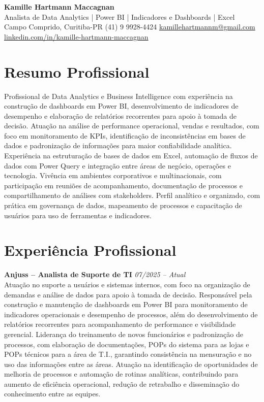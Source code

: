 \documentclass[11pt,a4paper]{article}
\newcommand{\cvheader}[4]{%
  \begin{center}
    {\LARGE\bfseries #1}\\[4pt]
    {\large #2}\\[6pt]
    #3\\[2pt]
    #4
  \end{center}
  \vspace{4pt}
}
\newcommand{\experience}[3]{%
  \textbf{#1} \hfill \textit{#2}\\[4pt]
  #3
  \vspace{8pt}
}
\begin{document}
\cvheader{Kamille Hartmann Maccagnan}%
{Analista de Data Analytics | Power BI | Indicadores e Dashboards | Excel}%
{Campo Comprido, Curitiba-PR \textbullet{} (41) 9 9928-4424 \textbullet{} \href{mailto:kamillehartmannm@gmail.com}{kamillehartmannm@gmail.com}}%
{\href{https://linkedin.com/in/kamille-hartmann-maccagnan/}{linkedin.com/in/kamille-hartmann-maccagnan}}

\section*{Resumo Profissional}

Profissional de Data Analytics e Business Intelligence com experiência na construção de dashboards em Power BI, desenvolvimento de indicadores de desempenho e elaboração de relatórios recorrentes para apoio à tomada de decisão. Atuação na análise de performance operacional, vendas e resultados, com foco em monitoramento de KPIs, identificação de inconsistências em bases de dados e padronização de informações para maior confiabilidade analítica. Experiência na estruturação de bases de dados em Excel, automação de fluxos de dados com Power Query e integração entre áreas de negócio, operações e tecnologia. Vivência em ambientes corporativos e multinacionais, com participação em reuniões de acompanhamento, documentação de processos e compartilhamento de análises com stakeholders. Perfil analítico e organizado, com prática em governança de dados, mapeamento de processos e capacitação de usuários para uso de ferramentas e indicadores.

\section*{Experiência Profissional}

\experience{Anjuss -- Analista de Suporte de TI}{07/2025 -- Atual}{%
Atuação no suporte a usuários e sistemas internos, com foco na organização de demandas e análise de dados para apoio à tomada de decisão. Responsável pela construção e manutenção de dashboards em Power BI para monitoramento de indicadores operacionais e desempenho de processos, além do desenvolvimento de relatórios recorrentes para acompanhamento de performance e visibilidade gerencial. Liderança do treinamento de novos funcionários e padronização de processos, com elaboração de documentações, POPs do sistema para as lojas e POPs técnicos para a área de T.I., garantindo consistência na mensuração e no uso das informações entre as áreas. Atuação na identificação de oportunidades de melhoria de processos e automação de rotinas analíticas, contribuindo para aumento de eficiência operacional, redução de retrabalho e disseminação do conhecimento entre as equipes.}
\end{document}
